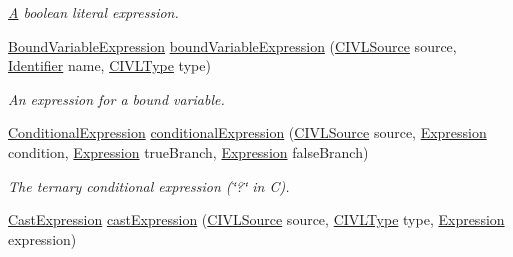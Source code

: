 \begin{DoxyCompactItemize}
\begin{DoxyCompactList}\small\item\em \hyperlink{structA}{A} boolean literal expression. \end{DoxyCompactList}\item 
\hyperlink{interfaceedu_1_1udel_1_1cis_1_1vsl_1_1civl_1_1model_1_1IF_1_1expression_1_1BoundVariableExpression}{Bound\+Variable\+Expression} \hyperlink{classedu_1_1udel_1_1cis_1_1vsl_1_1civl_1_1model_1_1common_1_1CommonModelFactory_af67f98f5ab98a86ef34b8865306f627f}{bound\+Variable\+Expression} (\hyperlink{interfaceedu_1_1udel_1_1cis_1_1vsl_1_1civl_1_1model_1_1IF_1_1CIVLSource}{C\+I\+V\+L\+Source} source, \hyperlink{interfaceedu_1_1udel_1_1cis_1_1vsl_1_1civl_1_1model_1_1IF_1_1Identifier}{Identifier} name, \hyperlink{interfaceedu_1_1udel_1_1cis_1_1vsl_1_1civl_1_1model_1_1IF_1_1type_1_1CIVLType}{C\+I\+V\+L\+Type} type)
\begin{DoxyCompactList}\small\item\em An expression for a bound variable. \end{DoxyCompactList}\item 
\hyperlink{interfaceedu_1_1udel_1_1cis_1_1vsl_1_1civl_1_1model_1_1IF_1_1expression_1_1ConditionalExpression}{Conditional\+Expression} \hyperlink{classedu_1_1udel_1_1cis_1_1vsl_1_1civl_1_1model_1_1common_1_1CommonModelFactory_a6e78bf773410afbbf46c7af0f3ba3fb2}{conditional\+Expression} (\hyperlink{interfaceedu_1_1udel_1_1cis_1_1vsl_1_1civl_1_1model_1_1IF_1_1CIVLSource}{C\+I\+V\+L\+Source} source, \hyperlink{interfaceedu_1_1udel_1_1cis_1_1vsl_1_1civl_1_1model_1_1IF_1_1expression_1_1Expression}{Expression} condition, \hyperlink{interfaceedu_1_1udel_1_1cis_1_1vsl_1_1civl_1_1model_1_1IF_1_1expression_1_1Expression}{Expression} true\+Branch, \hyperlink{interfaceedu_1_1udel_1_1cis_1_1vsl_1_1civl_1_1model_1_1IF_1_1expression_1_1Expression}{Expression} false\+Branch)
\begin{DoxyCompactList}\small\item\em The ternary conditional expression (\char`\"{}?\char`\"{} in C). \end{DoxyCompactList}\item 
\hyperlink{interfaceedu_1_1udel_1_1cis_1_1vsl_1_1civl_1_1model_1_1IF_1_1expression_1_1CastExpression}{Cast\+Expression} \hyperlink{classedu_1_1udel_1_1cis_1_1vsl_1_1civl_1_1model_1_1common_1_1CommonModelFactory_a60b8ee163d08ce5052d340337f26e46c}{cast\+Expression} (\hyperlink{interfaceedu_1_1udel_1_1cis_1_1vsl_1_1civl_1_1model_1_1IF_1_1CIVLSource}{C\+I\+V\+L\+Source} source, \hyperlink{interfaceedu_1_1udel_1_1cis_1_1vsl_1_1civl_1_1model_1_1IF_1_1type_1_1CIVLType}{C\+I\+V\+L\+Type} type, \hyperlink{interfaceedu_1_1udel_1_1cis_1_1vsl_1_1civl_1_1model_1_1IF_1_1expression_1_1Expression}{Expression} expression)

\end{DoxyCompactItemize}
